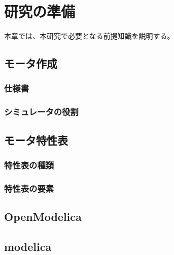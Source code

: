 \chapter{研究の準備}\label{cha:Preparation}
本章では、本研究で必要となる前提知識を説明する。

\section{モータ作成}\label{motor}
\subsection{仕様書}\label{siyo}
\subsection{シミュレータの役割}\label{simu}

\section{モータ特性表}\label{toku}
\subsection{特性表の種類}\label{syu}
\subsection{特性表の要素}\label{ele}

\section{OpenModelica}\label{OM}

\section{modelica}\label{modelica}





